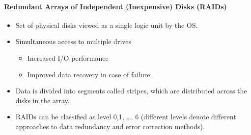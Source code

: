 \documentclass{article}%
\begin{document}
\paragraph{Redundant Arrays of Independent (Inexpensive) Disks (RAIDs)}
\label{sec:orga6a8005}
\begin{itemize}
\item Set of physical disks viewed as a single logic unit by the OS.
\item Simultaneous access to multiple drives
\begin{itemize}
\item Increased I/O performance
\item Improved data recovery in case of failure
\end{itemize}
\item Data is divided into segments called stripes, which are distributed across the disks in the array.
\item RAIDs can be classified as level 0,1, \ldots , 6 (different levels denote different approaches to data redundancy and error correction methods).
\end{itemize}
\end{document}
